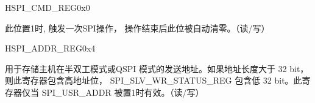 

\begin{register}{H}{SPI\_CMD\_REG}{0x0}\label{regdesc:SPICMDREG}
%
%
%
\regnewline%
\begin{regdesc}\begin{reglist}
\item [SPI\_USR] 此位置1时, 触发一次SPI操作， 操作结束后此位被自动清零。（读/写）
\end{reglist}\end{regdesc}
\end{register}

\begin{register}{H}{SPI\_ADDR\_REG}{0x4}\label{regdesc:SPIADDRREG}
%
\regnewline%
\begin{regdesc}\begin{reglist}
\item [SPI\_ADDR\_REG] 用于存储主机在半双工模式或QSPI 模式的发送地址。如果地址长度大于 32 bit， 则此寄存器包含高地址位， SPI\_SLV\_WR\_STATUS\_REG 包含低 32 bit。此寄存器仅当 SPI\_USR\_ADDR 被置1时有效。（读/写）
\end{reglist}\end{regdesc}
\end{register}

